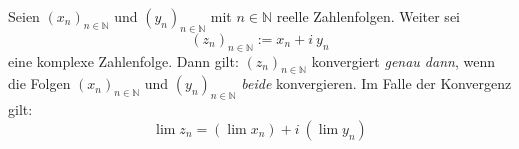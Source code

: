 Seien $(x_n)_{n\in\mathbb{N}}$ und $(y_n)_{n\in\mathbb{N}}$ mit $n \in \mathbb{N}$ reelle Zahlenfolgen. Weiter sei
$$(z_n)_{n\in\mathbb{N}} := x_n + i \ y_n$$
eine komplexe Zahlenfolge. Dann gilt: $(z_n)_{n\in\mathbb{N}}$ konvergiert \textit{genau dann}, wenn die Folgen $(x_n)_{n\in\mathbb{N}}$ und $(y_n)_{n\in\mathbb{N}}$ \textit{beide} konvergieren. Im Falle der Konvergenz gilt:
$$\lim z_n = (\lim x_n) + i \ (\lim y_n)$$